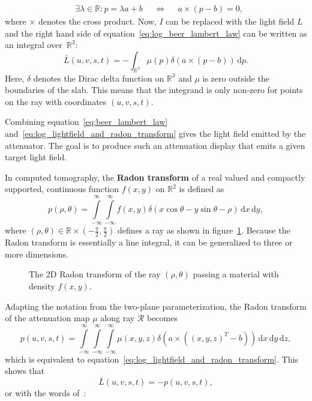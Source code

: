 \begin{align}
& \exists \lambda \in \mathbb{R} : p = \lambda a + b & & \iff & & a \times (p - b) = 0, 
\end{align} 
where $\times$ denotes the cross product.
Now, $I$ can be replaced with the light field $L$ and the right hand side of equation~\ref{eq:log_beer_lambert_law} can be written as an integral over~$\mathbb{R}^3$:
\begin{equation}\label{eq:log_lightfield_and_radon_transform}
\bar{L}(u, v, s, t) = 	%
-\int_{\mathbb{R}^3}
\mu(p) \delta ( a \times (p - b) ) \, 
\mathrm{d}p.
\end{equation}
Here, $\delta$ denotes the Dirac delta function on $\mathbb{R}^3$ and $\mu$ is zero outside the boundaries of the slab. 
This means that the integrand is only non-zero for points on the ray with coordinates $(u, v, s, t)$.

Combining equation~\ref{eq:beer_lambert_law} and~\ref{eq:log_lightfield_and_radon_transform} gives the light field emitted by the attenuator.
The goal is to produce such an attenuation display that emits a given target light field.

In computed tomography, the \textbf{Radon transform} of a real valued and compactly supported, continuous function $f(x, y)$ on $\mathbb{R}^2$ is defined as
\begin{equation}
p(\rho, \theta) = 	\int \limits_{-\infty}^{\infty} 
\int \limits_{-\infty}^{\infty}
f(x, y) \delta (x \cos \theta - y \sin \theta - \rho) \, 
\mathrm{d}x \,
\mathrm{d}y,
\end{equation}
where $(\rho, \theta) \in \mathbb{R} \times \left(- \frac{\pi}{2}, \frac{\pi}{2}\right)$ defines a ray as shown in figure~\ref{fig:radon_transform_2D_sketch}.
Because the Radon transform is essentially a line integral, it can be generalized to three or more dimensions.
\begin{figure}[tb]
	\centering
	
	\caption[The Radon transform]
			{The 2D Radon transform of the ray $(\rho, \theta)$ passing a material with density $f(x, y)$.}
	\label{fig:radon_transform_2D_sketch}
\end{figure}
Adapting the notation from the two-plane parameterization, the Radon transform of the attenuation map $\mu$ along ray $\mathcal{R}$ becomes
\begin{equation}
p(u, v, s, t) = 	\int \limits_{-\infty}^{\infty} 
\int \limits_{-\infty}^{\infty}
\int \limits_{-\infty}^{\infty}
\mu(x, y, z) \delta \left(a \times \left((x, y, z)^T - b\right) \right) \, 
\mathrm{d}x \,
\mathrm{d}y \,
\mathrm{d}z, 
\end{equation}
which is equivalent to equation~\ref{eq:log_lightfield_and_radon_transform}.
This shows that
\begin{equation}\label{eq:log_light_field_negative_radon}
\bar{L}(u, v, s, t) = -p(u, v, s, t), 
\end{equation}
or with the words of~\cite{WetzsteinTomo}: 

